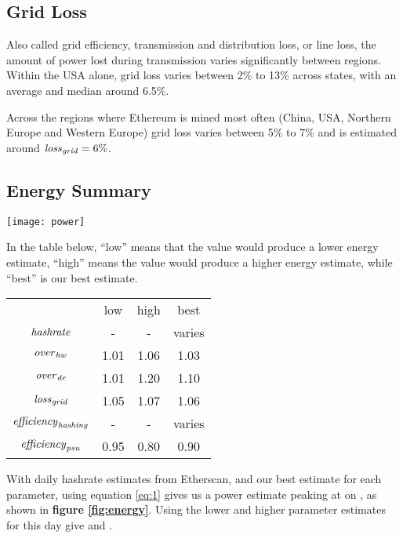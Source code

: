 \subsection{Grid Loss}

Also called grid efficiency, transmission and distribution loss, or line loss, the amount of power lost during transmission varies significantly between regions\cite{wirfs-brock_lost_2015}. Within the USA alone, grid loss varies between 2\% to 13\% across states, with an average and median around 6.5\%.

Across the regions where Ethereum is mined most often (China, USA, Northern Europe and Western Europe) grid loss varies between 5\% to 7\% and is estimated around $\mathit{loss}_\mathit{grid} = 6\%$.

\subsection{Energy Summary}

\begin{figure*}[htp]
    \centering
    \texttt{[image: power]}
    \caption{Ethereum network power in Gigawatts and equivalent annualized Terawatt hours per year, based on energy equation \ref{eq:1} and parameters. Shaded region shows the range between our lower and upper estimates.}
    \label{fig:energy}
\end{figure*}

In the table below, ``low'' means that the value would produce a lower energy estimate, ``high'' means the value would produce a higher energy estimate, while ``best'' is our best estimate.

\begin{center}
\begin{tabular}{ c c c c }
 & low & high & best \\
$\mathit{hashrate}$ & - & - & varies \\
$\mathit{over}_\mathit{hw}$ & 1.01 & 1.06 & 1.03 \\
$\mathit{over}_\mathit{dc}$ & 1.01 & 1.20 & 1.10 \\
$\mathit{loss}_\mathit{grid}$ & 1.05 & 1.07 & 1.06 \\
$\mathit{efficiency}_\mathit{hashing}$ & - & - & varies \\
$\mathit{efficiency}_\mathit{psu}$ & 0.95 & 0.80 & 0.90
\end{tabular}
\end{center}

With daily hashrate estimates from Etherscan\cite{etherscanio_ethereum_2021}, and our best estimate for each parameter, using equation \ref{eq:1} gives us a power estimate peaking at  on , as shown in \textbf{figure \ref{fig:energy}}. Using the lower and higher parameter estimates for this day give  and .

